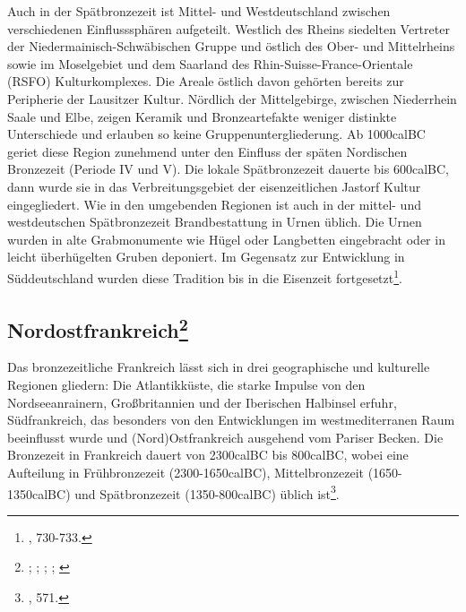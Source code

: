 \documentclass[openany,twoside,twocolumn]{book}
\let\rmarkdownfootnote\footnote%
\def\footnote{\protect\rmarkdownfootnote}
\begin{document}
Auch in der Spätbronzezeit ist Mittel- und Westdeutschland zwischen
verschiedenen Einflusssphären aufgeteilt. Westlich des Rheins siedelten
Vertreter der Niedermainisch-Schwäbischen Gruppe und östlich des Ober-
und Mittelrheins sowie im Moselgebiet und dem Saarland des
Rhin-Suisse-France-Orientale (RSFO) Kulturkomplexes. Die Areale östlich
davon gehörten bereits zur Peripherie der Lausitzer Kultur. Nördlich der
Mittelgebirge, zwischen Niederrhein Saale und Elbe, zeigen Keramik und
Bronzeartefakte weniger distinkte Unterschiede und erlauben so keine
Gruppenuntergliederung. Ab 1000calBC geriet diese Region zunehmend unter
den Einfluss der späten Nordischen Bronzezeit (Periode IV und V). Die
lokale Spätbronzezeit dauerte bis 600calBC, dann wurde sie in das
Verbreitungsgebiet der eisenzeitlichen Jastorf Kultur eingegliedert. Wie
in den umgebenden Regionen ist auch in der mittel- und westdeutschen
Spätbronzezeit Brandbestattung in Urnen üblich. Die Urnen wurden in alte
Grabmonumente wie Hügel oder Langbetten eingebracht oder in leicht
überhügelten Gruben deponiert. Im Gegensatz zur Entwicklung in
Süddeutschland wurden diese Tradition bis in die Eisenzeit
fortgesetzt\footnote{\textcite{jockenhovel_germany_2013}, 730-733.}.

\hypertarget{nordostfrankreich}{%
\subsection[Nordostfrankreich]{\texorpdfstring{Nordostfrankreich\footnote{\textcite{bourgeois_lage_2005-1};
  \textcite{briard_groupe_1988}; \textcite{gomez_bronze_1995};
  \textcite{mordant_bronze_2013}; \textcite{mordant_les_2005}}}{Nordostfrankreich}}\label{nordostfrankreich}}

Das bronzezeitliche Frankreich lässt sich in drei geographische und
kulturelle Regionen gliedern: Die Atlantikküste, die starke Impulse von
den Nordseeanrainern, Großbritannien und der Iberischen Halbinsel
erfuhr, Südfrankreich, das besonders von den Entwicklungen im
westmediterranen Raum beeinflusst wurde und (Nord)Ostfrankreich
ausgehend vom Pariser Becken. Die Bronzezeit in Frankreich dauert von
2300calBC bis 800calBC, wobei eine Aufteilung in Frühbronzezeit
(2300-1650calBC), Mittelbronzezeit (1650-1350calBC) und Spätbronzezeit
(1350-800calBC) üblich ist\footnote{\textcite{mordant_bronze_2013}, 571.}.
\end{document}

